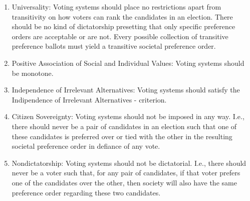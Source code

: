\begin{enumerate} %
\item Universality: Voting systems should place no restrictions apart from transitivity on how voters can rank the candidates in an election. There should be no kind of dictatorship presetting that only specific preference orders are acceptable or are not. Every possible collection of transitive preference ballots must yield a transitive societal preference order. 
\item Positive Association of Social and Individual Values: Voting systems should be monotone. 
\item Independence of Irrelevant Alternatives: Voting systems should satisfy the Indipendence of Irrelevant Alternatives - criterion. 
\item Citizen Sovereignty: Voting systems should not be imposed in any way. I.e., there should never be a pair of candidates in an election such that one of these candidates is preferred over or tied with the other in the resulting societal preference order in defiance of any vote. 
\item Nondictatorship: Voting systems should not be dictatorial. I.e., there should never be a voter such that, for any pair of candidates, if that voter prefers one of the candidates over the other, then society will also have the same preference order regarding these two candidates. 
\end{enumerate}














